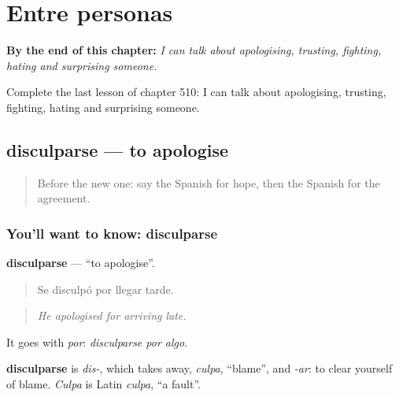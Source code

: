 
\chapter{Entre personas}
\label{ch:es-entre-personas}

\begin{chapteropening}
\textbf{By the end of this chapter:} \emph{I can talk about apologising, trusting, fighting, hating and surprising someone.}

Complete the last lesson of chapter 510: I can talk about apologising, trusting, fighting, hating and surprising someone.
\end{chapteropening}

\section[disculparse]{disculparse — to apologise}

\label{lesson:ES-C510-disculparse}



\begin{quote}
Before the new one: say the Spanish for hope, then the Spanish for the agreement.
\end{quote}

\subsection*{You'll want to know: disculparse}
\textbf{disculparse} — \textquotedblleft{}to apologise\textquotedblright{}.

\begin{quote}
Se disculpó por llegar tarde.
\end{quote}

\begin{quote}
\emph{He apologised for arriving late.}
\end{quote}

It goes with \emph{por}: \emph{disculparse por algo}.

\begin{cousinweb}
\textbf{disculparse} is \emph{dis-}, which takes away, \emph{culpa}, \textquotedblleft{}blame\textquotedblright{}, and \emph{-ar}: to clear yourself of blame. \emph{Culpa} is Latin \emph{culpa}, \textquotedblleft{}a fault\textquotedblright{}.
\end{cousinweb}

